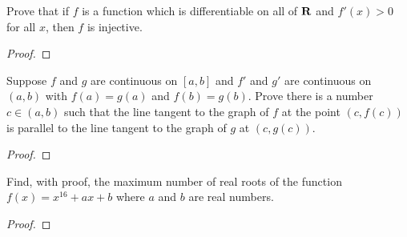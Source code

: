 \documentclass[11pt,twoside,openany]{memoir}
\begin{document}
\newpage
\fancyhead[L]{\scalebox{0.9}{Derivatives and the Mean Value Theorem}}
\fancyhead[R]{\scalebox{0.9}{Appeared on: S23}}
\begin{problem}
    Prove that if $f$ is a function which is differentiable on all of $\mathbf{R}$ and $f'(x) > 0$ for all $x$, then $f$ is injective.
\end{problem}
\begin{proof}
\end{proof}

\newpage
\fancyhead[L]{\scalebox{0.9}{Derivatives and the Mean Value Theorem}}
\fancyhead[R]{\scalebox{0.9}{Appeared on: W23}}
\begin{problem}
    Suppose $f$ and $g$ are continuous on $[a,b]$ and $f'$ and $g'$ are continuous on $(a,b)$ with $f(a) = g(a)$ and $f(b) = g(b)$. Prove there is a number $c \in (a,b)$ such that the line tangent to the graph of $f$ at the point $(c,f(c))$ is parallel to the line tangent to the graph of $g$ at $(c,g(c))$.
\end{problem}
\begin{proof}
\end{proof}

\newpage
\fancyhead[L]{\scalebox{0.9}{Derivatives and the Mean Value Theorem}}
\fancyhead[R]{\scalebox{0.9}{Appeared on: S22}}
\begin{problem}
    Find, with proof, the maximum number of real roots of the function $f(x) = x^{16} + ax + b$ where $a$ and $b$ are real numbers.
\end{problem}
\begin{proof}
\end{proof}
\end{document}
